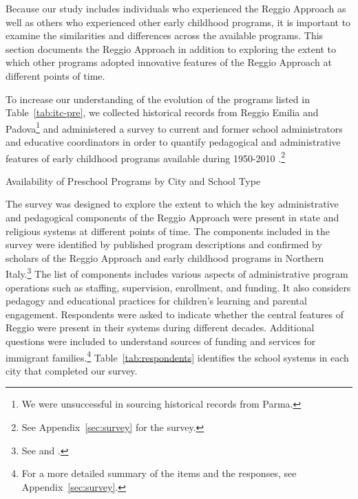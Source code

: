 Because our study includes individuals who experienced the Reggio Approach as well as others who experienced other early childhood programs, it is important to examine the similarities and differences across the available programs. This section documents the Reggio Approach in addition to exploring the extent to which other programs adopted innovative features of the Reggio Approach at different points of time.

To increase our understanding of the evolution of the programs listed in Table~\ref{tab:itc-pre}, we collected historical records from Reggio Emilia and Padova\footnote{We were unsuccessful in sourcing historical records from Parma.} \citep{Padova-Admin-Data_1964-2011,Reggio-Admin-data_1966-2006,Reggio-Annual-Journals_1994-2011} and administered a survey to current and former school administrators and educative coordinators in order to quantify pedagogical and administrative features of early childhood programs available during 1950-2010 \citep{CEHD_2016_Historical-Analysis}.\footnote{See Appendix~\ref{sec:survey} for the survey.}
~\\
\begin{table}[H]
\centering
\caption{Availability of Preschool Programs by City and School Type}\label{tab:itc-pre}
\begin{adjustbox}{width=\textwidth}
\begin{threeparttable}
	
\begin{tablenotes}
\end{tablenotes}
\end{threeparttable}
\end{adjustbox}
\end{table}

The survey was designed to explore the extent to which the key administrative and pedagogical components of the Reggio Approach were present in state and religious systems at different points of time. The components included in the survey were identified by published program descriptions and confirmed by scholars of the Reggio Approach and early childhood programs in Northern Italy.\footnote{See \citet{Edwards-etal-eds_1998_Hundred-Languages} and \citet{Corsaro_2008_Policy-Practice}.} The list of components includes various aspects of administrative program operations such as staffing, supervision, enrollment, and funding. It also considers pedagogy and educational practices for children's learning and parental engagement. Respondents were asked to indicate whether the central features of Reggio were present in their systems during different decades. Additional questions were included to understand sources of funding and services for immigrant families.\footnote{For a more detailed summary of the items and the responses, see Appendix~\ref{sec:survey}.} Table~\ref{tab:respondents} identifies the school systems in each city that completed our survey.

